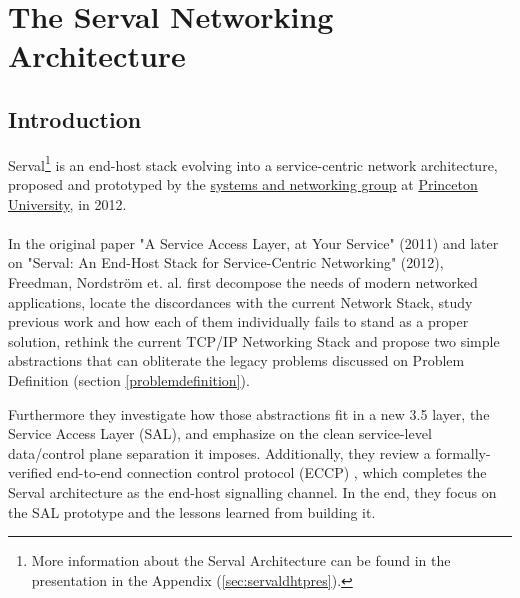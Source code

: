 \newpage
\section{The Serval Networking Architecture}
\subsection{Introduction}
Serval\footnote{More information about the Serval Architecture can be found in the presentation in the Appendix (\ref{sec:servaldhtpres}).} is an end-host stack evolving into a service-centric network architecture, proposed and prototyped by the \href{https://sns.cs.princeton.edu/}{systems and networking group} at \href{https://www.princeton.edu}{Princeton University}, in 2012.



\paragraph{} In the original paper "A Service Access Layer, at Your Service" (2011)\cite{Freedman2011} and later on "Serval: An End-Host Stack for Service-Centric Networking" (2012)\cite{Nordstrom2012}, Freedman, Nordstr{\"o}m et. al. first decompose the needs of modern networked applications, locate the discordances with the current Network Stack, study previous work and how each of them individually fails to stand as a proper solution, rethink the current TCP/IP Networking Stack and propose two simple abstractions that can obliterate the legacy problems discussed on Problem Definition (section \ref{problemdefinition}).

Furthermore they investigate how those abstractions fit in a new 3.5 layer, the Service Access Layer (SAL), and emphasize on the clean service-level data/control plane separation it imposes.
Additionally, they review a formally-verified end-to-end connection control protocol (ECCP) , which completes the Serval architecture as the end-host signalling channel. 
In the end, they focus on the SAL prototype and the lessons learned from building it.






\newpage

